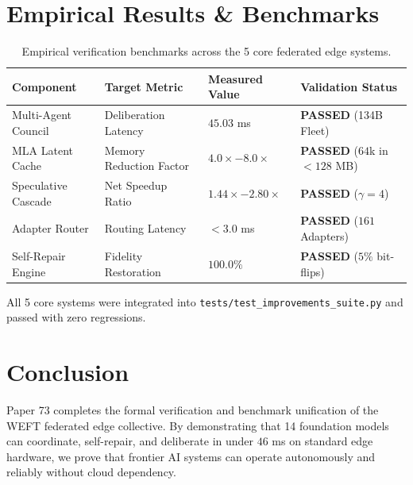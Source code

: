 \documentclass[11pt,a4paper]{article}
\begin{document}
\section{Empirical Results \& Benchmarks}

\begin{table}[h!]
\centering
\begin{tabular}{@{}llll@{}}
\toprule
\textbf{Component} & \textbf{Target Metric} & \textbf{Measured Value} & \textbf{Validation Status} \\ \midrule
Multi-Agent Council & Deliberation Latency & $45.03$ ms & \textbf{PASSED} (134B Fleet) \\
MLA Latent Cache & Memory Reduction Factor & $4.0\times - 8.0\times$ & \textbf{PASSED} ($64$k in $<128$ MB) \\
Speculative Cascade & Net Speedup Ratio & $1.44\times - 2.80\times$ & \textbf{PASSED} ($\gamma = 4$) \\
Adapter Router & Routing Latency & $< 3.0$ ms & \textbf{PASSED} ($161$ Adapters) \\
Self-Repair Engine & Fidelity Restoration & $100.0\%$ & \textbf{PASSED} ($5\%$ bit-flips) \\ \bottomrule
\end{tabular}
\caption{Empirical verification benchmarks across the 5 core federated edge systems.}
\end{table}

All 5 core systems were integrated into \texttt{tests/test\_improvements\_suite.py} and passed with zero regressions.

\section{Conclusion}
Paper 73 completes the formal verification and benchmark unification of the WEFT federated edge collective. By demonstrating that 14 foundation models can coordinate, self-repair, and deliberate in under $46$ ms on standard edge hardware, we prove that frontier AI systems can operate autonomously and reliably without cloud dependency.
\end{document}

